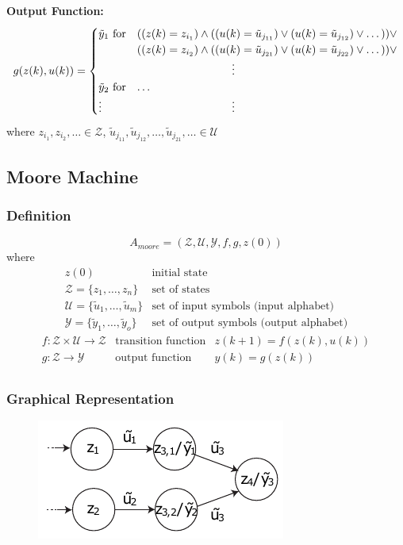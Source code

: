 \documentclass[10pt,a4paper]{article}
\newcommand{\tab}[1][1]{\hspace*{#1cm}}
\begin{document}
\textbf{Output Function:} ~\\
$$
	g(z(k), u(k)) = \begin{cases}
		\tilde y_1 \text{ for} & ((z(k) = z_{i_1}) \land ((u(k) = \tilde u_{j_{11}}) \lor (u(k) = \tilde u_{j_{12}}) \lor \dots)) \lor \\
		& ((z(k) = z_{i_2}) \land ((u(k) = \tilde u_{j_{21}}) \lor (u(k) = \tilde u_{j_{22}}) \lor \dots)) \lor \\
		& \tab[3] \vdots \\
		\tilde y_2 \text{ for} & \dots \\
		\vdots & \tab[3] \vdots 
	\end{cases}
$$
where $z_{i_1}, z_{i_2}, \dots \in \mathcal Z$, $\tilde u_{j_{11}}, \tilde u_{j_{12}}, \dots, \tilde u_{j_{21}}, \dots \in \mathcal U$

\subsection{Moore Machine}
\subsubsection{Definition}
$$
	A_{moore} = (\mathcal Z, \mathcal U, \mathcal Y, f, g, z(0))
$$ where
$$
	\begin{array}{ll}
		z(0) & \text{initial state} \\
		\mathcal Z = \{z_1, \dots, z_n\} & \text{set of states} \\
		\mathcal U = \{\tilde{u}_1, \dots, \tilde{u}_m\} & \text{set of input symbols (input alphabet)} \\
		\mathcal Y = \{\tilde y_1, \dots, \tilde y_o\} & \text{set of output symbols (output alphabet)}
	\end{array}
$$
$$
	\begin{array}{lll}
		f : \mathcal Z \times \mathcal U → \mathcal Z & \text{transition function} & z(k + 1) = f(z(k), u(k)) \\
		g : \mathcal Z → \mathcal Y & \text{output function} & y(k) = g(z(k)) \\
	\end{array}
$$

\subsubsection{Graphical Representation}
\begin{figure}[H]
	\includegraphics[width=0.7\columnwidth]{figures/fsm_moore.pdf}
\end{figure}
\end{document}
